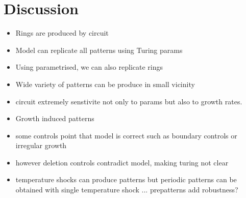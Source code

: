 \section{Discussion}
\begin{itemize}
    \item Rings are produced by circuit
    \item Model can replicate all patterns using Turing params
    \item Using parametrised, we can also replicate rings
    \item Wide variety of patterns can be produce in small vicinity
    \item circuit extremely senstivite not only to params but also to growth rates.
    \item Growth induced patterns
    \item some controls point that model is correct such as boundary controls or irregular growth
    \item however deletion controls contradict model, making turing not clear
    \item temperature shocks can produce patterns but periodic patterns can be obtained with single temperature shock ... prepatterns add robustness?

\end{itemize}


